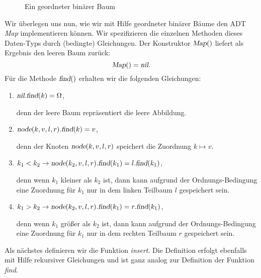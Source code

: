 \begin{figure}[!ht]
  \centering
  \caption{Ein geordneter bin\"arer Baum}
  \label{fig:graph1}
\end{figure}


Wir \"uberlegen uns nun, wie wir mit Hilfe geordneter bin\"arer B\"aume den ADT \textsl{Map}
implementieren k\"onnen.  Wir spezifizieren die einzelnen Methoden dieses Daten-Typs durch
(bedingte) Gleichungen.  Der Konstruktor $\textsl{Map}()$ liefert als Ergebnis den leeren Baum zur\"uck:
\[ \textsl{Map}() = \textsl{nil}. \]
F\"ur die Methode $\textsl{find}()$ erhalten wir die folgenden Gleichungen:
\begin{enumerate}
\item $\textsl{nil}\mathtt{.}\textsl{find}(k) = \Omega$,

      denn der leere Baum repr\"asentiert die leere Abbildung.
\item $\textsl{node}(k, v, l, r)\mathtt{.}\textsl{find}(k) = v$,

      denn der Knoten $\textsl{node}(k,v,l,r)$ speichert die Zuordnung $k \mapsto v$.
\item $k_1 < k_2 \rightarrow \textsl{node}(k_2, v, l, r)\mathtt{.}\textsl{find}( k_1) = l\mathtt{.}\textsl{find}(k_1)$,

      denn wenn $k_1$ kleiner als $k_2$ ist, dann kann aufgrund der Ordnungs-Bedingung
      eine Zuordnung f\"ur $k_1$ nur in dem linken Teilbaum $l$ gespeichert sein.
\item $k_1 > k_2 \rightarrow \textsl{node}(k_2, v, l, r)\mathtt{.}\textsl{find}( k_1 ) = r\mathtt{.}\textsl{find}(k_1)$,

      denn wenn $k_1$ gr\"o{\ss}er als $k_2$ ist, dann kann aufgrund der Ordnungs-Bedingung
      eine Zuordnung f\"ur $k_1$ nur in dem rechten Teilbaum $r$ gespeichert sein.
\end{enumerate}
Als n\"achstes definieren wir die Funktion \textsl{insert}.  Die Definition erfolgt
ebenfalls mit Hilfe rekursiver Gleichungen und ist ganz analog zur Definition der 
Funktion \textsl{find}.

